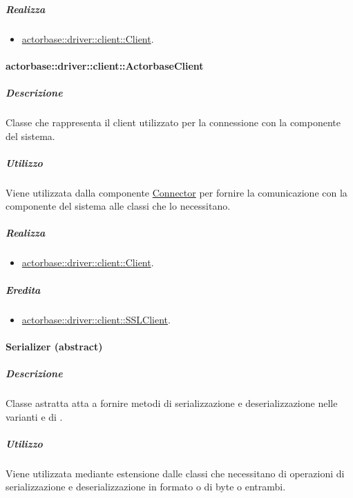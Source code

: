 \documentclass{scalatekids-article}
\begin{document}
\subparagraph{Realizza}

\begin{itemize}
\item \hyperref[sec:actorbase::driver::client::Client]{actorbase::driver::client::Client}.
\end{itemize}

\paragraph{actorbase::driver::client::ActorbaseClient}
\label{sec:actorbase::driver::client::ActorbaseClient}

\subparagraph{Descrizione}

Classe che rappresenta il client utilizzato per la connessione con la componente
 del sistema.

\subparagraph{Utilizzo}

Viene utilizzata dalla componente
\hyperref[sec:actorbase::driver::client::Connector]{Connector} per fornire la
comunicazione con la componente  del sistema alle classi che lo
necessitano.

\subparagraph{Realizza}

\begin{itemize}
\item \hyperref[sec:actorbase::driver::client::Client]{actorbase::driver::client::Client}.
\end{itemize}

\subparagraph{Eredita}

\begin{itemize}
\item \hyperref[sec:actorbase::driver::client::SSLClient]{actorbase::driver::client::SSLClient}.
\end{itemize}

\paragraph{Serializer (abstract)}
\label{sec:actorbase::driver::client::Serializer}

\subparagraph{Descrizione}

Classe astratta atta a fornire metodi di serializzazione e deserializzazione nelle
varianti  e  di .

\subparagraph{Utilizzo}

Viene utilizzata mediante estensione dalle classi che necessitano di operazioni di
serializzazione e deserializzazione in formato  o  di byte
o entrambi.
\end{document}
